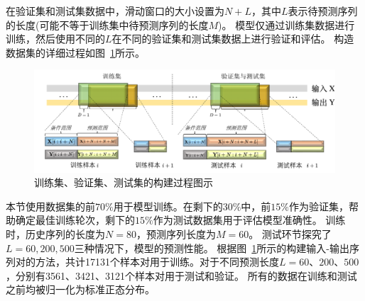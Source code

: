 在验证集和测试集数据中，滑动窗口的大小设置为$N+L$，其中$L$表示待预测序列的长度(可能不等于训练集中待预测序列的长度$M$)。
模型仅通过训练集数据进行训练，然后使用不同的$L$在不同的验证集和测试集数据上进行验证和评估。
构造数据集的详细过程如图~\ref{fig:dataset}所示。
\begin{figure}[t]
    \centering
    \includegraphics[width=\linewidth]{figures/chapter3/dataset.pdf}
    \caption{
    训练集、验证集、测试集的构建过程图示
    }
    \label{fig:dataset}
\end{figure}

本节使用数据集的前$70\%$用于模型训练。在剩下的$30\%$中，前$15\%$作为验证集，帮助确定最佳训练轮次，剩下的$15\%$作为测试数据集用于评估模型准确性。
训练时，历史序列的长度为$N=80$，预测序列长度为$M=60$。
测试环节探究了$L=60, 200, 500$三种情况下，模型的预测性能。
根据图~\ref{fig:dataset}所示的构建输入-输出序列对的方法，共计17131个样本对用于训练。对于不同预测长度$L=60、200、500$，分别有3561、3421、3121个样本对用于测试和验证。
所有的数据在训练和测试之前均被归一化为标准正态分布。




